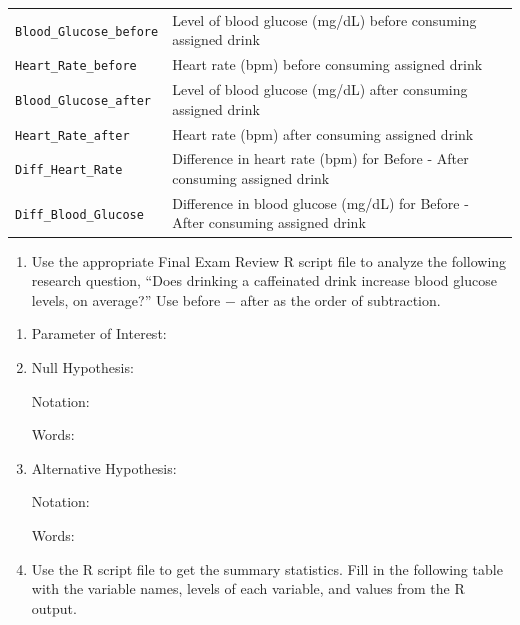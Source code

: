 \documentclass[
]{report}
\providecommand{\tightlist}{%
  \setlength{\itemsep}{0pt}\setlength{\parskip}{0pt}}
\begin{document}
\begin{longtable}[]{@{}
  >{\raggedright\arraybackslash}p{}
  >{\raggedright\arraybackslash}p{}@{}}
\texttt{Blood\_Glucose\_before} & Level of blood glucose (mg/dL) before consuming assigned drink \\
\texttt{Heart\_Rate\_before} & Heart rate (bpm) before consuming assigned drink \\
\texttt{Blood\_Glucose\_after} & Level of blood glucose (mg/dL) after consuming assigned drink \\
\texttt{Heart\_Rate\_after} & Heart rate (bpm) after consuming assigned drink \\
\texttt{Diff\_Heart\_Rate} & Difference in heart rate (bpm) for Before - After consuming assigned drink \\
\texttt{Diff\_Blood\_Glucose} & Difference in blood glucose (mg/dL) for Before - After consuming assigned drink \\
\end{longtable}

\newpage

\begin{enumerate}
\def\labelenumi{\arabic{enumi}.}
\tightlist
\item
  Use the appropriate Final Exam Review R script file to analyze the following research question, ``Does drinking a caffeinated drink increase blood glucose levels, on average?'' Use before \(-\) after as the order of subtraction.
\end{enumerate}

\begin{enumerate}
\def\labelenumi{\alph{enumi}.}
\item
  Parameter of Interest:
  \vspace{0.3in}
\item
  Null Hypothesis:

  Notation:
  \vspace{0.3in}

  Words:
  \vspace{0.5in}
\item
  Alternative Hypothesis:

  Notation:
  \vspace{0.3in}

  Words:
  \vspace{0.5in}
\item
  Use the R script file to get the summary statistics. Fill in the following table with the variable names, levels of each variable, and values from the R output.
\end{enumerate}
\end{document}
